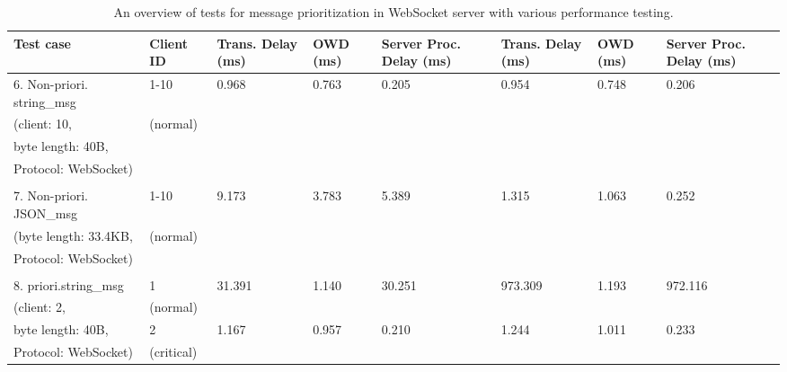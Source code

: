     \begin{table}[htbp]
        \footnotesize
    \centering
    \caption{An overview of tests for message prioritization in WebSocket server with various performance testing.}
    \label{tab: TestsPriority}

    \begin{tabular}{m{} m{} m{} m{} m{} m{} m{} m{}}
        \hline
        \textbf{Test case}                     & \textbf{Client ID}  & \textbf{Trans. Delay (ms)} & \textbf{OWD (ms)}    & \textbf{Server Proc. Delay (ms)} & \textbf{Trans. Delay (ms)} & \textbf{OWD (ms)}    & \textbf{Server Proc. Delay (ms)} \\ \hline
        6. Non-priori. string\_msg    & 1-10       & 0.968   & 0.763  & 0.205   & 0.954   & 0.748  & 0.206   \\
        (client: 10,                  & (normal)   &         &        &         &         &        &         \\
        byte length: 40B,             &            &         &        &         &         &        &         \\
        Protocol: WebSocket)          &            &         &        &         &         &        &         \\
        & & & & & & &\\
        7. Non-priori. JSON\_msg      & 1-10       & 9.173   & 3.783  & 5.389   & 1.315   & 1.063  & 0.252   \\
        (byte length: 33.4KB,         & (normal)   &         &        &         &         &        &         \\
        Protocol: WebSocket)          &            &         &        &         &         &        &         \\
        & & & & & & &\\
        8. priori.string\_msg         & 1          & 31.391  & 1.140  & 30.251  & 973.309 & 1.193  & 972.116 \\
        (client: 2,                   & (normal)   &         &        &         &         &        &         \\
        byte length: 40B,             & 2          & 1.167   & 0.957  & 0.210   & 1.244   & 1.011  & 0.233   \\
        Protocol: WebSocket)          & (critical) &         &        &         &         &        &         \\

\end{tabular}
\end{table}
